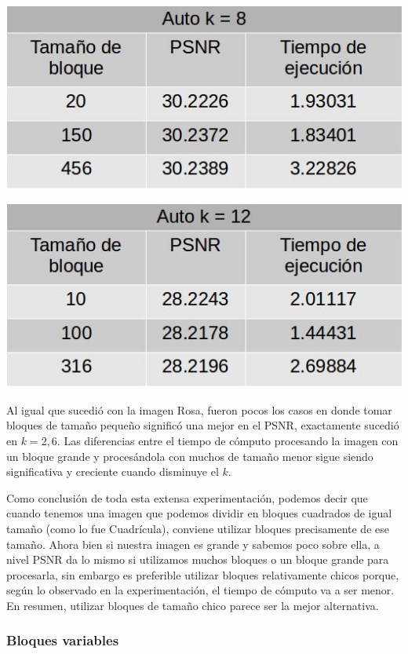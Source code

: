 \documentclass[a4paper]{article}
\begin{document}
\centerline{
\includegraphics[scale=0.5]{imagenes/autok8Tabla.jpg}
}
\vspace{1cm}

\centerline{
\includegraphics[scale=0.5]{imagenes/autok12Tabla.jpg}
}

Al igual que sucedió con la imagen Rosa, fueron pocos los casos en donde tomar bloques de tamaño pequeño significó una mejor en el PSNR, exactamente sucedió en $k = 2, 6$. Las diferencias entre el tiempo de cómputo procesando la imagen con un bloque grande y procesándola con muchos de tamaño menor sigue siendo significativa y creciente cuando disminuye el $k$.
\par Como conclusión de toda esta extensa experimentación, podemos decir que cuando tenemos una imagen que podemos dividir en bloques cuadrados de igual tamaño (como lo fue Cuadrícula), conviene utilizar bloques precisamente de ese tamaño. Ahora bien si nuestra imagen es grande y sabemos poco sobre ella, a nivel PSNR da lo mismo si utilizamos muchos bloques o un bloque grande para procesarla, sin embargo es preferible utilizar bloques relativamente chicos porque, según lo observado en la experimentación, el tiempo de cómputo va a ser menor. En resumen, utilizar bloques de tamaño chico parece ser la mejor alternativa.


\subsubsection{Bloques variables}
\end{document}
